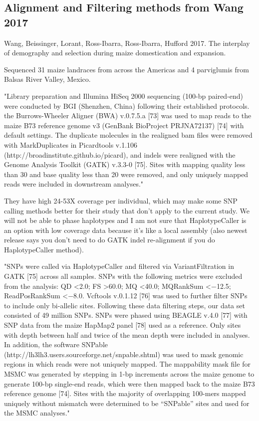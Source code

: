 \documentclass[12pt]{report}
\begin{document}
\subsection{Alignment and Filtering methods from Wang 2017}
Wang, Beissinger, Lorant, Ross-Ibarra, Ross-Ibarra, Hufford 2017. The interplay of demography and selection during maize domestication and expansion.\par
Sequenced 31 maize landraces from across the Americas and 4 parviglumis from Balsas River Valley, Mexico.\par
"Library preparation and Illumina HiSeq 2000 sequencing (100-bp paired-end) were conducted by BGI (Shenzhen, China) following their established protocols. the Burrows-Wheeler Aligner (BWA) v.0.7.5.a [73] was used to map reads to the maize B73 reference genome v3 (GenBank BioProject PRJNA72137) [74] with default settings. The duplicate molecules in the realigned bam files were removed with MarkDuplicates in Picardtools v.1.106 (http://broadinstitute.github.io/picard), and indels were realigned with the Genome Analysis Toolkit (GATK) v.3.3-0 [75]. Sites with mapping quality less than 30 and base quality less than 20 were removed, and only uniquely mapped reads were included in downstream analyses."\par
They have high 24-53X coverage per individual, which may make some SNP calling methods better for their study that don't apply to the current study. We will not be able to phase haplotypes and I am not sure that HaplotypeCaller is an option with low coverage data because it's like a local assembly (also newest release says you don't need to do GATK indel re-alignment if you do HaplotypeCaller method).\par
"SNPs were called via HaplotypeCaller and filtered via VariantFiltration in GATK [75] across all samples. SNPs with the following metrics were excluded from the analysis: QD <2.0; FS >60.0; MQ <40.0; MQRankSum <−12.5; ReadPosRankSum <−8.0. Vcftools v.0.1.12 [76] was used to further filter SNPs to include only bi-allelic sites. Following these data filtering steps, our data set consisted of 49 million SNPs. SNPs were phased using BEAGLE v.4.0 [77] with SNP data from the maize HapMap2 panel [78] used as a reference. Only sites with depth between half and twice of the mean depth were included in analyses. In addition, the software SNPable (http://lh3lh3.users.sourceforge.net/snpable.shtml) was used to mask genomic regions in which reads were not uniquely mapped. The mappability mask file for MSMC was generated by stepping in 1-bp increments across the maize genome to generate 100-bp single-end reads, which were then mapped back to the maize B73 reference genome [74]. Sites with the majority of overlapping 100-mers mapped uniquely without mismatch were determined to be “SNPable” sites and used for the MSMC analyses."\par
\end{document}
